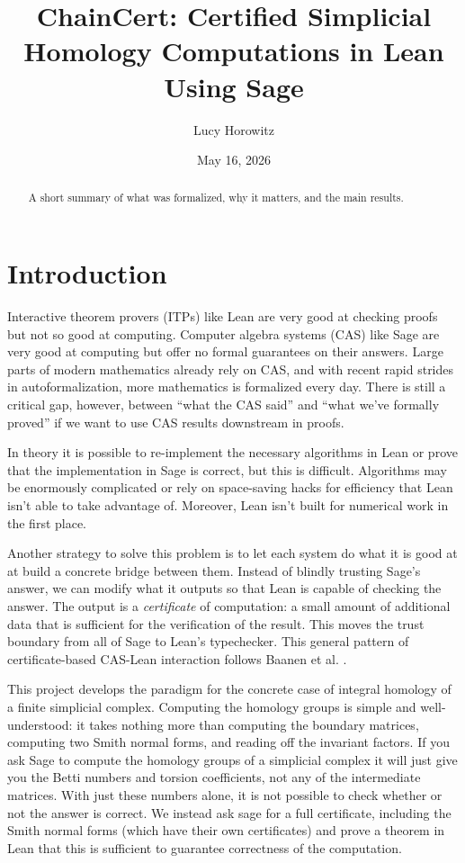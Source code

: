 \documentclass[11pt]{article}
\title{ChainCert: Certified Simplicial Homology Computations in Lean Using Sage}
\author{Lucy Horowitz}
\date{May 16, 2026}
\theoremstyle{plain}
\theoremstyle{definition}
\theoremstyle{remark}
\begin{document}
\maketitle

\begin{abstract}
A short summary of what was formalized, why it matters, and the main results.
\end{abstract}

\section{Introduction}\label{sec:intro}
Interactive theorem provers (ITPs) like Lean are very good at checking proofs but not so good at computing. Computer algebra systems (CAS) like Sage are very good at computing but offer no formal guarantees on their answers. Large parts of modern mathematics already rely on CAS, and with recent rapid strides in autoformalization, more mathematics is formalized every day. There is still a critical gap, however, between ``what the CAS said'' and ``what we've formally proved'' if we want to use CAS results downstream in proofs. 

In theory it is possible to re-implement the necessary algorithms in Lean or prove that the implementation in Sage is correct, but this is difficult. Algorithms may be enormously complicated or rely on space-saving hacks for efficiency that Lean isn't able to take advantage of. Moreover, Lean isn't built for numerical work in the first place.

Another strategy to solve this problem is to let each system do what it is good at at build a concrete bridge between them. Instead of blindly trusting Sage's answer, we can modify what it outputs so that Lean is capable of checking the answer. The output is a \textit{certificate} of computation: a small amount of additional data that is sufficient for the verification of the result. This moves the trust boundary from all of Sage to Lean's typechecker. This general pattern of certificate-based CAS-Lean interaction follows Baanen et al. \cite{baanen}.

This project develops the paradigm for the concrete case of integral homology of a finite simplicial complex. Computing the homology groups is simple and well-understood: it takes nothing more than computing the boundary matrices, computing two Smith normal forms, and reading off the invariant factors. If you ask Sage to compute the homology groups of a simplicial complex it will just give you the Betti numbers and torsion coefficients, not any of the intermediate matrices. With just these numbers alone, it is not possible to check whether or not the answer is correct. We instead ask sage for a full certificate, including the Smith normal forms (which have their own certificates) and prove a theorem in Lean that this is sufficient to guarantee correctness of the computation. 
\end{document}
